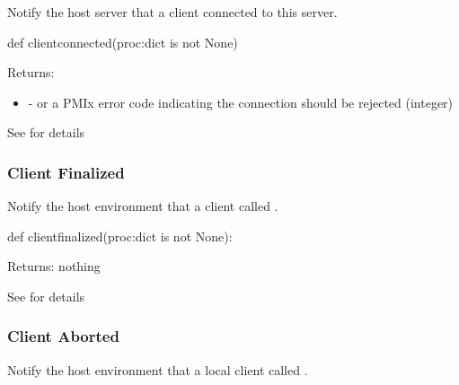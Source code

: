 \summary

Notify the host server that a client connected to this server.

\format

\pyspecificstart
\begin{codepar}
def clientconnected(proc:dict is not None)
\end{codepar}
\pyspecificend

\begin{arglist}
\end{arglist}

Returns:
\begin{itemize}
    \item {} -  or a \ac{PMIx} error code indicating the connection should be rejected (integer)
\end{itemize}

See  for details

\subsubsection{Client Finalized}

\summary

Notify the host environment that a client called .

\format

\pyspecificstart
\begin{codepar}
def clientfinalized(proc:dict is not None):
\end{codepar}
\pyspecificend

\begin{arglist}
\end{arglist}

Returns: nothing

See  for details


\subsubsection{Client Aborted}

\summary

Notify the host environment that a local client called .

